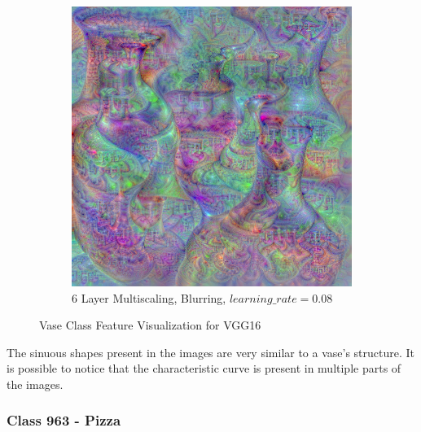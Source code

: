 \begin{figure}
\begin{subfigure}[t]{0.31\textwidth}
    \end{subfigure}
    \hfill
    \begin{subfigure}[t]{0.31\textwidth}
        \captionsetup{justification=centering}
        \centering
        \includegraphics[width=.7\linewidth]{figuras/feat_vis/experiments/classes/cl883/random_image_ci883_lr8e-2_pl6.png}
        \caption{6 Layer Multiscaling, Blurring, \(learning\_rate = 0.08\)}
    \end{subfigure}

    \caption{Vase Class Feature Visualization for VGG16}
    \label{fig:class_vase}
\end{figure}

The sinuous shapes present in the images are very similar to a vase's structure.
It is possible to notice that the characteristic curve is present in multiple parts of the images.

\newpage
\subsubsection{Class 963 - Pizza}

